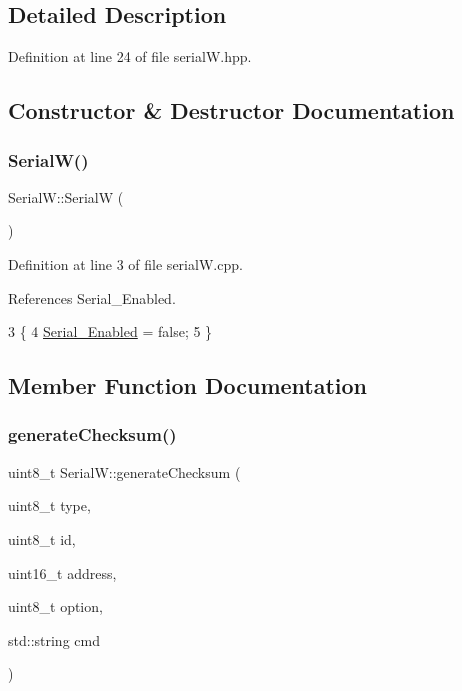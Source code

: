 \subsection{Detailed Description}


Definition at line 24 of file serial\+W.\+hpp.



\subsection{Constructor \& Destructor Documentation}
\mbox{\label{class_serial_w_acba41f819a6ac6e0372ef113a1843985}} 
\subsubsection{\texorpdfstring{Serial\+W()}{SerialW()}}
{\footnotesize\ttfamily Serial\+W\+::\+SerialW (\begin{DoxyParamCaption}{ }\end{DoxyParamCaption})}



Definition at line 3 of file serial\+W.\+cpp.



References Serial\+\_\+\+Enabled.


\begin{DoxyCode}
3                  \{
4     \hyperlink{class_serial_w_a557f72152ee772956c44fade26c1fd14}{Serial\_Enabled} = \textcolor{keyword}{false};
5 \}
\end{DoxyCode}


\subsection{Member Function Documentation}
\mbox{\label{class_serial_w_a757c428d5a375862430ddef74512a043}} 
\subsubsection{\texorpdfstring{generate\+Checksum()}{generateChecksum()}}
{\footnotesize\ttfamily uint8\+\_\+t Serial\+W\+::generate\+Checksum (\begin{DoxyParamCaption}\item[{uint8\+\_\+t}]{type,  }\item[{uint8\+\_\+t}]{id,  }\item[{uint16\+\_\+t}]{address,  }\item[{uint8\+\_\+t}]{option,  }\item[{std\+::string}]{cmd }\end{DoxyParamCaption})}



